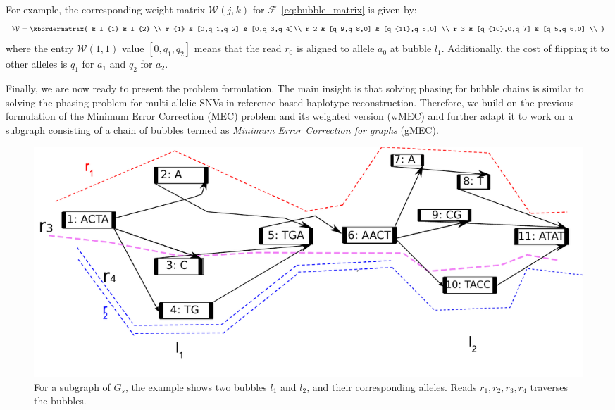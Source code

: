 For example, the corresponding weight matrix $\mathcal{W}(j,k)$ for $\mathcal{F}$~\eqref{eq:bubble_matrix} is given by:
\begin{equation}\label{eq:weight_matrix}
  \mathcal{W}  = \kbordermatrix{
     & l_{1}       & l_{2}  \\
    r_{1}       & [0,q_1,q_2] &  [0,q_3,q_4]\\
    r_2 & [q_9,q_8,0] & [q_{11},q_5,0] \\
    r_3 & [q_{10},0,q_7] & [q_5,q_6,0] \\
  }
\end{equation}
where the entry $\mathcal{W}(1,1)$ value $[0,q_1,q_2]$ means that the read $r_0$ is aligned to allele $a_0$ at bubble $l_1$.
Additionally, the cost of flipping it to other alleles is $q_1$ for $a_1$ and $q_2$ for $a_2$.

Finally, we are now ready to present the problem formulation.
The main insight is that solving phasing for bubble chains is similar to solving the phasing problem for multi-allelic SNVs in reference-based haplotype reconstruction.
Therefore, we build on the previous formulation of the Minimum Error Correction (MEC) problem \citep{Lancia2001} and its weighted version (wMEC) \citep{Lippert:2002ba,patterson2014whatshap} and further adapt it to work on a subgraph consisting of a chain of bubbles termed as \emph{Minimum Error Correction for graphs} (gMEC).

\begin{figure}[t!]\centering
\includegraphics[width=\columnwidth]{wmecfig.pdf}
\caption{For a subgraph of $G_s$, the example shows two bubbles $l_1$ and $l_2$, and their corresponding alleles. Reads $r_1,r_2,r_3,r_4$ traverses the bubbles.}
\label{fig:wmec}
\end{figure}

